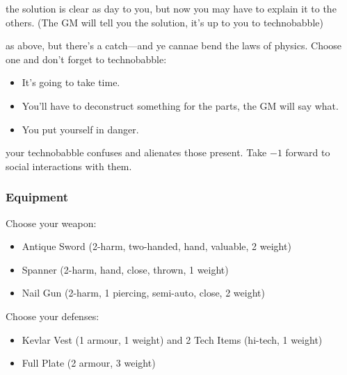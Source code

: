 {the solution is clear as day to you, but now you may have to explain it to the others. (The GM will tell you the solution, it's up to you to technobabble)}
{as above, but there's a catch---and ye cannae bend the laws of physics. Choose one and don't forget to technobabble:
\begin{itemize}
\item It's going to take time.
\item You’ll have to deconstruct something for the parts, the GM will say what.
\item You put yourself in danger.
\end{itemize}}
{your technobabble confuses and alienates those present. Take $-1$ forward to social interactions with them.}


\subsubsection{Equipment}
Choose your weapon:
\begin{itemize}
\item Antique Sword (2-harm, two-handed, hand, valuable, 2 weight)
\item Spanner (2-harm, hand, close, thrown, 1 weight)
\item Nail Gun (2-harm, 1 piercing, semi-auto, close, 2 weight)
\end{itemize}

Choose your defenses:
\begin{itemize}
\item Kevlar Vest (1 armour, 1 weight) and 2 Tech Items (hi-tech, 1 weight)
\item Full Plate (2 armour, 3 weight)
\end{itemize}

